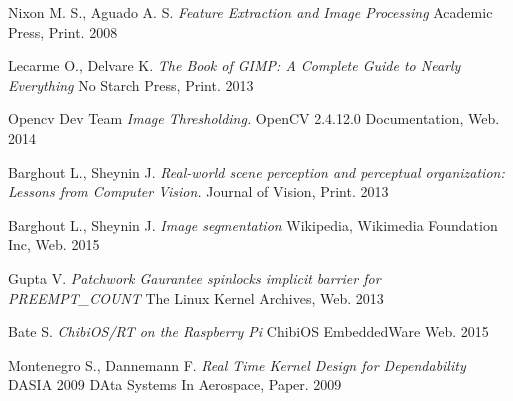 \documentclass[12pt,twoside,a4paper]{article}
\begin{document}
\begin{thebibliography}{9}
Nixon M. S., Aguado A. S.
\textit{Feature Extraction and Image Processing} Academic Press, Print. 2008

Lecarme  O., Delvare K.
\textit{The Book of GIMP: A Complete Guide to Nearly Everything} No Starch Press, Print. 2013

Opencv Dev Team
\textit{Image Thresholding.} OpenCV 2.4.12.0 Documentation, Web. 2014

Barghout L., Sheynin J.
\textit{Real-world scene perception and perceptual organization: Lessons from Computer Vision.} Journal of Vision, Print. 2013

Barghout L., Sheynin J.
\textit{Image segmentation} Wikipedia, Wikimedia Foundation Inc, Web. 2015

Gupta V.
\textit{Patchwork Gaurantee spinlocks implicit barrier for PREEMPT\_COUNT} The Linux Kernel Archives, Web. 2013

Bate S.
\textit{ChibiOS/RT on the Raspberry Pi} ChibiOS EmbeddedWare Web. 2015

Montenegro S., Dannemann F. 
\textit{Real Time Kernel Design for Dependability} DASIA 2009 DAta Systems In Aerospace, Paper. 2009



\end{thebibliography}
\end{document}
